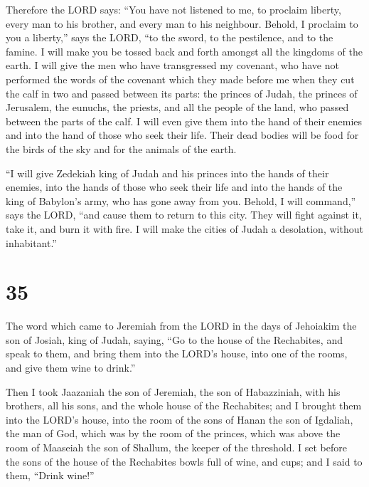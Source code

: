  Therefore the LORD says: ``You have not listened to me,
to proclaim liberty, every man to his brother, and every man to his
neighbour. Behold, I proclaim to you a liberty,'' says the LORD, ``to
the sword, to the pestilence, and to the famine. I will make you be
tossed back and forth amongst all the kingdoms of the earth.
 I will give the men who have transgressed my covenant,
who have not performed the words of the covenant which they made before
me when they cut the calf in two and passed between its parts:
 the princes of Judah, the princes of Jerusalem, the
eunuchs, the priests, and all the people of the land, who passed between
the parts of the calf.  I will even give them into the
hand of their enemies and into the hand of those who seek their life.
Their dead bodies will be food for the birds of the sky and for the
animals of the earth.

 ``I will give Zedekiah king of Judah and his princes
into the hands of their enemies, into the hands of those who seek their
life and into the hands of the king of Babylon's army, who has gone away
from you.  Behold, I will command,'' says the LORD, ``and
cause them to return to this city. They will fight against it, take it,
and burn it with fire. I will make the cities of Judah a desolation,
without inhabitant.''

\hypertarget{section-34}{%
\section{35}\label{section-34}}

 The word which came to Jeremiah from the LORD in the days
of Jehoiakim the son of Josiah, king of Judah, saying, 
``Go to the house of the Rechabites, and speak to them, and bring them
into the LORD's house, into one of the rooms, and give them wine to
drink.''

 Then I took Jaazaniah the son of Jeremiah, the son of
Habazziniah, with his brothers, all his sons, and the whole house of the
Rechabites;  and I brought them into the LORD's house,
into the room of the sons of Hanan the son of Igdaliah, the man of God,
which was by the room of the princes, which was above the room of
Maaseiah the son of Shallum, the keeper of the threshold. 
I set before the sons of the house of the Rechabites bowls full of wine,
and cups; and I said to them, ``Drink wine!''

